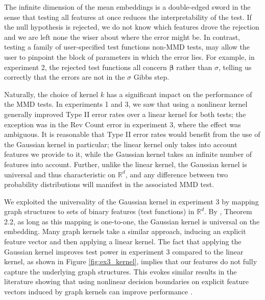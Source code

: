 \documentclass[a4paper,11pt]{article}
\begin{document}
The infinite dimension of the mean embeddings is a double-edged sword in the sense that testing all features at once reduces the interpretability of the test. If the null hypothesis is rejected, we do not know which features drove the rejection and we are left none the wiser about where the error might be. In contrast, testing a family of user-specified test functions non-MMD tests, may allow the user to pinpoint the block of parameters in which the error lies. For example, in experiment 2, the rejected test functions all concern $\mathbf{\beta}$ rather than $\sigma$, telling us correctly that the errors are not in the $\sigma$ Gibbs step.

Naturally, the choice of kernel $k$ has a significant impact on the performance of the MMD tests. In experiments 1 and 3, we saw that using a nonlinear kernel generally improved Type II error rates over a linear kernel for both tests; the exception was in the Rev Count error in experiment 3, where the effect was ambiguous. It is reasonable that Type II error rates would benefit from the use of the Gaussian kernel in particular; the linear kernel only takes into account features we provide to it, while the Gaussian kernel takes an infinite number of features into account. Further, unlike the linear kernel, the Gaussian kernel is universal and thus characteristic on $\mathbb{R}^{d}$, and any difference between two probability distributions will manifest in the associated MMD test.

We exploited the universality of the Gaussian kernel in experiment 3 by mapping graph structures to sets of binary features (test functions) in $\mathbb{R}^{d}$. By \cite{christmann_universal_2010}, Theorem 2.2, as long as this mapping is one-to-one, the Gaussian kernel is universal on the embedding. Many graph kernels take a similar approach, inducing an explicit feature vector and then applying a linear kernel. The fact that applying the Gaussian kernel improves test power in experiment 3 compared to the linear kernel, as shown in Figure \ref{fig:ex3_kernel}, implies that our features do not fully capture the underlying graph structures. This evokes similar results in the literature showing that using nonlinear decision boundaries on explicit feature vectors induced by graph kernels can improve performance \cite{kriege_survey_2020}. 
\end{document}
